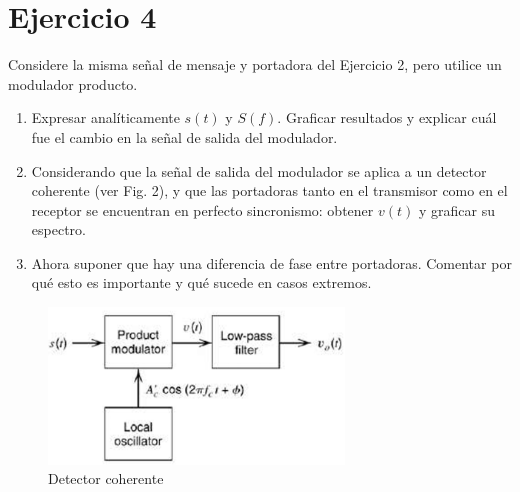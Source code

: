 \section{Ejercicio 4}

Considere la misma señal de mensaje y portadora del Ejercicio 2, pero utilice un modulador producto.

\begin{enumerate}[label=\alph*)]
    \item Expresar analíticamente $s(t)$ y $S(f)$. Graficar resultados y explicar cuál fue el cambio en la señal de salida del modulador.
    \item Considerando que la señal de salida del modulador se aplica a un detector coherente (ver Fig. 2), y que las portadoras tanto en el transmisor como en el receptor se encuentran en perfecto sincronismo: obtener $v(t)$ y graficar su espectro.
    \item Ahora suponer que hay una diferencia de fase entre portadoras. Comentar por qué esto es importante y qué sucede en casos extremos.
\end{enumerate}

\begin{figure}[h!]
    \centering
    \includegraphics[width=0.7\textwidth]{imagenes/Parte_1/Actividad_4/fig2.png}
    \caption{Detector coherente}
\end{figure}
